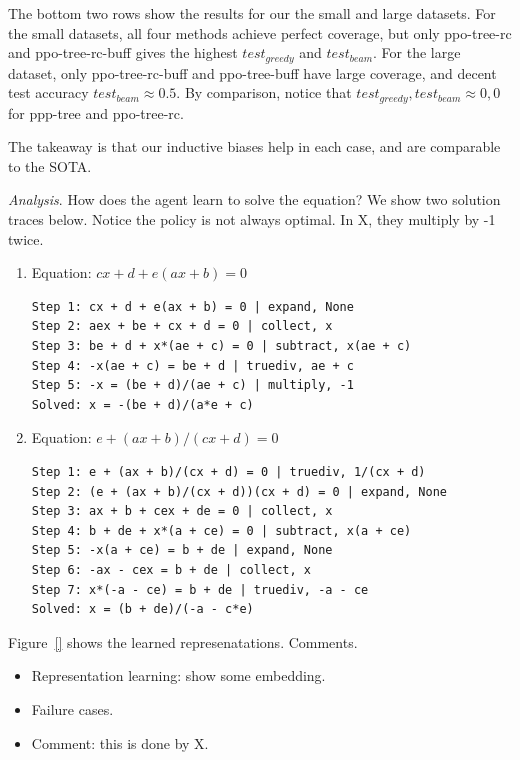 \documentclass{article}
\theoremstyle{plain}
\theoremstyle{definition}
\theoremstyle{remark}
\begin{document}
The bottom two rows show the results for our the small and large datasets. For the small datasets, all four methods achieve perfect coverage, but only ppo-tree-rc and ppo-tree-rc-buff gives the highest $test_{greedy}$ and $test_{beam}$. For the large dataset, only ppo-tree-rc-buff and ppo-tree-buff have large coverage, and decent test accuracy $test_{beam} \approx 0.5$. By comparison, notice that $test_{greedy}, test_{beam} \approx 0, 0$ for ppp-tree and ppo-tree-rc. 

The takeaway is that our inductive biases help in each case, and are comparable to the SOTA. 

\textit{Analysis}. How does the agent learn to solve the equation? We show two solution traces below. Notice the policy is not always optimal. In X, they multiply by -1 twice. 
\begin{enumerate}
\item Equation: $c x + d + e(a x + b) = 0$
\begin{verbatim}
Step 1: cx + d + e(ax + b) = 0 | expand, None
Step 2: aex + be + cx + d = 0 | collect, x
Step 3: be + d + x*(ae + c) = 0 | subtract, x(ae + c)
Step 4: -x(ae + c) = be + d | truediv, ae + c
Step 5: -x = (be + d)/(ae + c) | multiply, -1
Solved: x = -(be + d)/(a*e + c)
\end{verbatim}
\item Equation: $e + (a x + b)/(c x + d) = 0$
\begin{verbatim}
Step 1: e + (ax + b)/(cx + d) = 0 | truediv, 1/(cx + d)
Step 2: (e + (ax + b)/(cx + d))(cx + d) = 0 | expand, None
Step 3: ax + b + cex + de = 0 | collect, x
Step 4: b + de + x*(a + ce) = 0 | subtract, x(a + ce)
Step 5: -x(a + ce) = b + de | expand, None
Step 6: -ax - cex = b + de | collect, x
Step 7: x*(-a - ce) = b + de | truediv, -a - ce
Solved: x = (b + de)/(-a - c*e)
\end{verbatim}
\end{enumerate}

Figure~\ref{} shows the learned represenatations. Comments. 

\begin{itemize}
    \item Representation learning: show some embedding.
    \item Failure cases.
    \item Comment: this is done by X.
\end{itemize}



\end{document}
